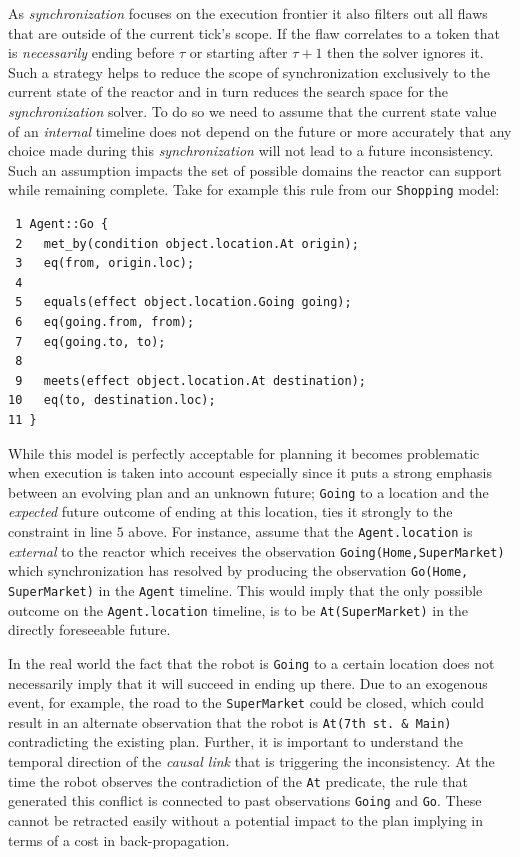 As {\em synchronization} focuses on the execution frontier it also
filters out all flaws that are outside of the current tick's scope.
If the flaw correlates to a token that is {\em necessarily} ending
before $\tau$ or starting after $\tau+1$ then the solver ignores
it. Such a strategy helps to reduce the scope of synchronization
exclusively to the current state of the reactor and in turn reduces
the search space for the {\em synchronization} solver.  To do so we
need to assume that the current state value of an {\em internal}
timeline does not depend on the future or more accurately that any
choice made during this {\em synchronization} will not lead to a
future inconsistency.  Such an assumption impacts the set of possible
domains the reactor can support while remaining complete. Take for
example this rule from our \texttt{Shopping} model:

\begin{verbatim}
 1 Agent::Go {
 2   met_by(condition object.location.At origin);
 3   eq(from, origin.loc);
 4
 5   equals(effect object.location.Going going);
 6   eq(going.from, from);
 7   eq(going.to, to);
 8   
 9   meets(effect object.location.At destination);
10   eq(to, destination.loc);
11 }
\end{verbatim}

While this model is perfectly acceptable for planning it becomes
problematic when execution is taken into account especially since it
puts a strong emphasis between an evolving plan and an unknown future;
\texttt{Going} to a location and the {\em expected} future outcome of
ending at this location, ties it strongly to the constraint in line
$5$ above. For instance, assume that the \texttt{Agent.location} is
{\em external} to the reactor which receives the observation
\texttt{Going(Home,SuperMarket)} which synchronization has resolved by
producing the observation \texttt{Go(Home, SuperMarket)} in the
\texttt{Agent} timeline. This would imply that the only possible
outcome on the \texttt{Agent.location} timeline, is to be
\texttt{At(SuperMarket)} in the directly foreseeable future. 

In the real world the fact that the robot is \texttt{Going} to a
certain location does not necessarily imply that it will succeed in
ending up there. Due to an exogenous event, for example, the road to
the \texttt{SuperMarket} could be closed, which could result in an
alternate observation that the robot is \texttt{At(7th st. \& Main)}
contradicting the existing plan. Further, it is important to
understand the temporal direction of the \emph{causal link} that is
triggering the inconsistency. At the time the robot observes the
contradiction of the \texttt{At} predicate, the rule that generated
this conflict is connected to past observations \texttt{Going} and
\texttt{Go}. These cannot be retracted easily without a potential
impact to the plan implying in terms of a cost in back-propagation.

